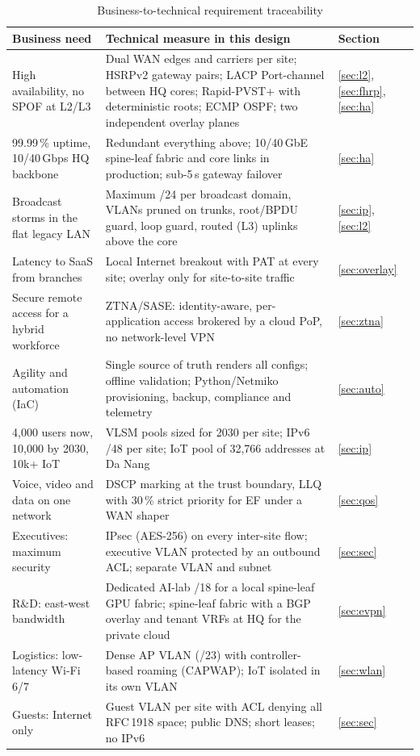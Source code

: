 \documentclass[11pt,a4paper]{article}
\begin{document}
\begin{table}[H]
\centering\small
\caption{Business-to-technical requirement traceability}
\label{tab:req}
\begin{tabularx}{\linewidth}{@{}p{3.6cm}X p{1.2cm}@{}}
\toprule
\textbf{Business need} & \textbf{Technical measure in this design} & \textbf{Section}\\
\midrule
High availability, no SPOF at L2/L3 & Dual WAN edges and carriers per site; HSRPv2 gateway pairs; LACP Port-channel between HQ cores; Rapid-PVST+ with deterministic roots; ECMP OSPF; two independent overlay planes & \ref{sec:l2}, \ref{sec:fhrp}, \ref{sec:ha}\\
99.99\,\% uptime, 10/40\,Gbps HQ backbone & Redundant everything above; 10/40\,GbE spine-leaf fabric and core links in production; sub-5\,s gateway failover & \ref{sec:ha}\\
Broadcast storms in the flat legacy LAN & Maximum /24 per broadcast domain, VLANs pruned on trunks, root/BPDU guard, loop guard, routed (L3) uplinks above the core & \ref{sec:ip}, \ref{sec:l2}\\
Latency to SaaS from branches & Local Internet breakout with PAT at every site; overlay only for site-to-site traffic & \ref{sec:overlay}\\
Secure remote access for a hybrid workforce & ZTNA/SASE: identity-aware, per-application access brokered by a cloud PoP, no network-level VPN & \ref{sec:ztna}\\
Agility and automation (IaC) & Single source of truth renders all configs; offline validation; Python/Netmiko provisioning, backup, compliance and telemetry & \ref{sec:auto}\\
4,000 users now, 10,000 by 2030, 10k+ IoT & VLSM pools sized for 2030 per site; IPv6 /48 per site; IoT pool of 32,766 addresses at Da Nang & \ref{sec:ip}\\
Voice, video and data on one network & DSCP marking at the trust boundary, LLQ with 30\,\% strict priority for EF under a WAN shaper & \ref{sec:qos}\\
Executives: maximum security & IPsec (AES-256) on every inter-site flow; executive VLAN protected by an outbound ACL; separate VLAN and subnet & \ref{sec:sec}\\
R\&D: east-west bandwidth & Dedicated AI-lab /18 for a local spine-leaf GPU fabric; spine-leaf fabric with a BGP overlay and tenant VRFs at HQ for the private cloud & \ref{sec:evpn}\\
Logistics: low-latency Wi-Fi 6/7 & Dense AP VLAN (/23) with controller-based roaming (CAPWAP); IoT isolated in its own VLAN & \ref{sec:wlan}\\
Guests: Internet only & Guest VLAN per site with ACL denying all RFC\,1918 space; public DNS; short leases; no IPv6 & \ref{sec:sec}\\
\bottomrule
\end{tabularx}
\end{table}
\end{document}

